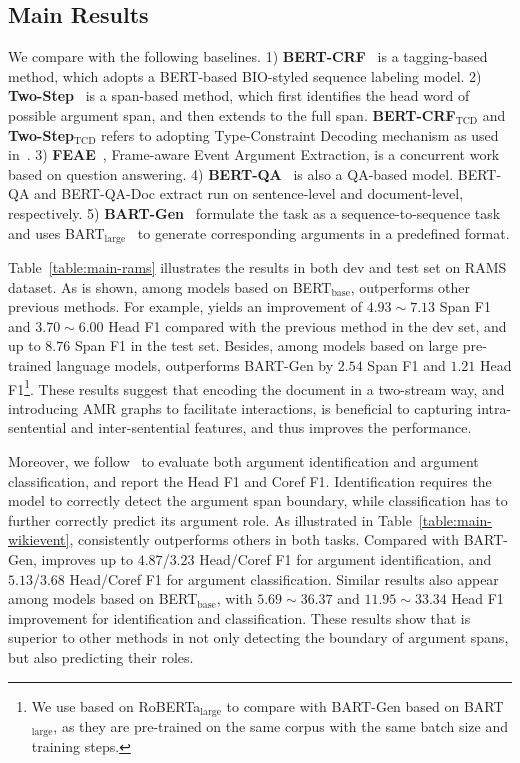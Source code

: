 \subsection{Main Results}


We compare \modelname with the following baselines.
1) \textbf{BERT-CRF}~\cite{seq} is a tagging-based method, which adopts a BERT-based BIO-styled sequence labeling model.
2) \textbf{Two-Step}~\cite{two-step} is a span-based method, which first identifies the head word of possible argument span, and then extends to the full span.
\textbf{BERT-CRF$_{\mathrm{TCD}}$} and \textbf{Two-Step$_{\mathrm{TCD}}$} refers to adopting Type-Constraint Decoding mechanism as used in~\cite{rams}.
3) \textbf{FEAE}~\cite{wei-etal-2021-trigger}, Frame-aware Event Argument Extraction, is a concurrent work based on question answering.
4) \textbf{BERT-QA}~\cite{bert-qa} is also a QA-based model. BERT-QA and BERT-QA-Doc extract run on sentence-level and document-level, respectively.
5) \textbf{BART-Gen}~\cite{wikievent} formulate the task as a sequence-to-sequence task and uses BART$_{\mathrm{large}}$~\cite{bart} to generate corresponding arguments in a predefined format.

Table~\ref{table:main-rams} illustrates the results in both dev and test set on RAMS dataset.
As is shown, among models based on BERT$_{\mathrm{base}}$, \modelname outperforms other previous methods.
For example, \modelname yields an improvement of $4.93\sim7.13$ Span F1 and $3.70\sim6.00$ Head F1 compared with the previous method in the dev set, and up to $8.76$ Span F1 in the test set.
Besides, among models based on large pre-trained language models, \modelname  outperforms BART-Gen by $2.54$ Span F1 and $1.21$ Head F1\footnote{We use \modelnamelarge based on RoBERTa$_{\mathrm{large}}$ to compare with BART-Gen based on BART$_{\mathrm{large}}$, as they are pre-trained on the same corpus with the same batch size and training steps.}.
These results suggest that encoding the document in a two-stream way, and introducing AMR graphs to facilitate interactions, is beneficial to capturing intra-sentential and inter-sentential features, and thus improves the performance.




Moreover, we follow~\citet{wikievent} to evaluate both argument identification and argument classification, and report the Head F1 and Coref F1.
Identification requires the model to correctly detect the argument span boundary, while classification has to further correctly predict its argument role.
As illustrated in Table~\ref{table:main-wikievent}, \modelname consistently outperforms others in both tasks.
Compared with BART-Gen, \modelname improves up to $4.87$/$3.23$ Head/Coref F1 for argument identification, and $5.13$/$3.68$ Head/Coref F1 for argument classification.
Similar results also appear among models based on BERT$_{\mathrm{base}}$, with $5.69\sim36.37$ and $11.95\sim33.34$ Head F1 improvement for identification and classification.
These results show that \modelname is superior to other methods in not only detecting the boundary of argument spans, but also predicting their roles.

